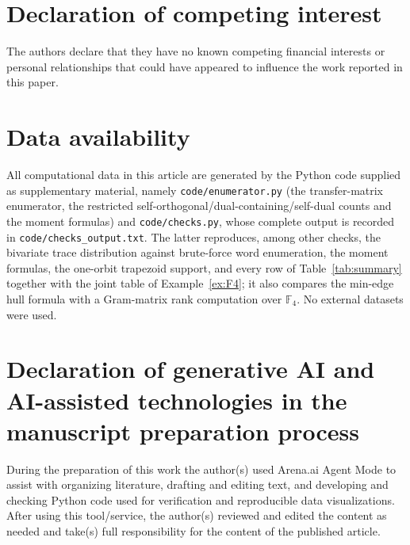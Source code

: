 \documentclass[11pt,a4paper]{article}
\newcommand{\F}{\mathbb F}
\numberwithin{equation}{section}
\theoremstyle{plain}
\theoremstyle{definition}
\theoremstyle{remark}
\begin{document}
\section*{Declaration of competing interest}
The authors declare that they have no known competing financial interests or
personal relationships that could have appeared to influence the work reported
in this paper.

\section*{Data availability}
All computational data in this article are generated by the Python code supplied
as supplementary material, namely \texttt{code/enumerator.py} (the transfer-matrix
enumerator, the restricted self-orthogonal/dual-containing/self-dual counts and
the moment formulas) and \texttt{code/checks.py}, whose complete output is
recorded in \texttt{code/checks\_output.txt}.  The latter reproduces, among other
checks, the bivariate trace distribution against brute-force word enumeration,
the moment formulas, the one-orbit trapezoid support, and every row of Table~\ref{tab:summary}
together with the joint table of Example~\ref{ex:F4}; it also compares the
min-edge hull formula with a Gram-matrix rank computation over $\F_4$.  No
external datasets were used.

\section*{Declaration of generative AI and AI-assisted technologies in the manuscript preparation process}
During the preparation of this work the author(s) used Arena.ai Agent Mode to
assist with organizing literature, drafting and editing text, and developing and
checking Python code used for verification and reproducible data visualizations.
After using this tool/service, the author(s) reviewed and edited the content as
needed and take(s) full responsibility for the content of the published article.



\end{document}
